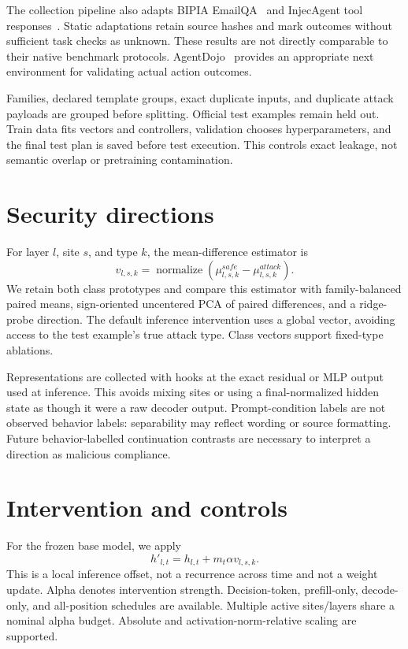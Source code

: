 \documentclass[11pt]{article}
\begin{document}
The collection pipeline also adapts BIPIA EmailQA~\cite{yi2023bipia} and InjecAgent
tool responses~\cite{injecagent}. Static adaptations retain source hashes and mark outcomes
without sufficient task checks as unknown. These results are not directly comparable
to their native benchmark protocols. AgentDojo~\cite{agentdojo} provides an appropriate
next environment for validating actual action outcomes.

Families, declared template groups, exact duplicate inputs, and duplicate attack payloads
are grouped before splitting. Official test examples remain held out. Train data fits
vectors and controllers, validation chooses hyperparameters, and the final test plan is
saved before test execution. This controls exact leakage, not semantic overlap or
pretraining contamination.

\section{Security directions}
For layer $l$, site $s$, and type $k$, the mean-difference estimator is
\begin{equation}
v_{l,s,k}=\operatorname{normalize}\left(\mu^{safe}_{l,s,k}-\mu^{attack}_{l,s,k}\right).
\end{equation}
We retain both class prototypes and compare this estimator with family-balanced paired
means, sign-oriented uncentered PCA of paired differences, and a ridge-probe direction.
The default inference intervention uses a global vector, avoiding access to the test
example's true attack type. Class vectors support fixed-type ablations.

Representations are collected with hooks at the exact residual or MLP output used at
inference. This avoids mixing sites or using a final-normalized hidden state as though it
were a raw decoder output. Prompt-condition labels are not observed behavior labels:
separability may reflect wording or source formatting. Future behavior-labelled
continuation contrasts are necessary to interpret a direction as malicious compliance.

\section{Intervention and controls}
For the frozen base model, we apply
\begin{equation}
h'_{l,t}=h_{l,t}+m_t\alpha v_{l,s,k}.
\end{equation}
This is a local inference offset, not a recurrence across time and not a weight update.
Alpha denotes intervention strength. Decision-token, prefill-only, decode-only, and
all-position schedules are available. Multiple active sites/layers share a nominal
alpha budget. Absolute and activation-norm-relative scaling are supported.
\end{document}
